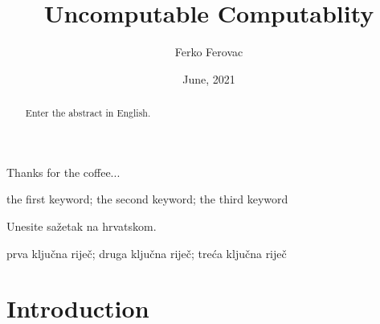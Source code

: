 \documentclass[bachelorthesis]{fer}
\title{Uncomputable Computablity}
\author{Ferko Ferovac}
\date{June, 2021}
\begin{document}
\maketitle






\begin{zahvale}
  Thanks for the coffee...
\end{zahvale}


\mainmatter



\begin{abstract}
  Enter the abstract in English.
  
  \blindtext
\end{abstract}

\begin{keywords}
  the first keyword; the second keyword; the third keyword
\end{keywords}


\begin{sazetak}
  Unesite sažetak na hrvatskom.

  \blindtext
\end{sazetak}

\begin{kljucnerijeci}
  prva ključna riječ; druga ključna riječ; treća ključna riječ
\end{kljucnerijeci}


\tableofcontents


\chapter{Introduction}
\label{chp:introduction}
\end{document}
